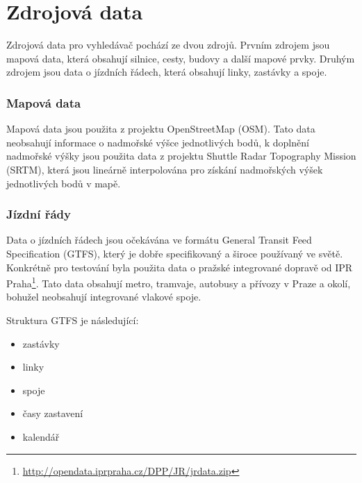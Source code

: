 \chapter{Zdrojová data}

Zdrojová data pro vyhledávač pochází ze dvou zdrojů. Prvním zdrojem jsou mapová
data, která obsahují silnice, cesty, budovy a další mapové prvky. Druhým zdrojem
jsou data o jízdních řádech, která obsahují linky, zastávky a spoje.

\subsection{Mapová data}
Mapová data jsou použita z projektu OpenStreetMap (OSM). Tato data neobsahují
informace o nadmořské výšce jednotlivých bodů, k doplnění nadmořské výšky jsou
použita data z projektu Shuttle Radar Topography Mission (SRTM), která jsou
lineárně interpolována pro získání nadmořských výšek jednotlivých bodů v mapě.

\subsection{Jízdní řády}
Data o jízdních řádech jsou očekávána ve formátu General Transit Feed
Specification (GTFS), který je dobře specifikovaný a široce používaný ve světě.
Konkrétně pro testování byla použita data o pražské integrované dopravě od IPR
Praha\footnote{\url{http://opendata.iprpraha.cz/DPP/JR/jrdata.zip}}. Tato data
obsahují metro, tramvaje, autobusy a přívozy v Praze a okolí, bohužel neobsahují
integrované vlakové spoje.

Struktura GTFS je následující:
\begin{itemize}
\item zastávky
\item linky
\item spoje
\item časy zastavení
\item kalendář
\end{itemize}

